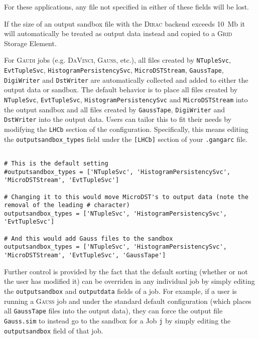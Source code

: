 \documentclass{howto}
\def\gaudi {\textsc{Gaudi}\xspace}
\def\davinci {\textsc{DaVinci}\xspace}
\def\dirac {\textsc{Dirac}\xspace}
\def\gauss {\textsc{Gauss}\xspace}
\def\grid {\textsc{Grid}\xspace}
\begin{document}
For these applications, any file not specified in either of these fields 
will be lost.

\begin{notice}
  If the size of an output sandbox file with the \dirac backend exceeds 10~Mb 
  it will automatically be treated as output data instead and copied to a \grid
  Storage Element.
\end{notice}

For \gaudi jobs (e.g. \davinci, \gauss, etc.), all files created by 
\texttt{NTupleSvc}, \texttt{EvtTupleSvc}, \texttt{HistogramPersistencySvc}, 
\texttt{MicroDSTStream},
\texttt{GaussTape}, \texttt{DigiWriter} and \texttt{DstWriter} are 
automatically collected and added to either the output data or sandbox.
The default behavior is to place all files created by 
\texttt{NTupleSvc}, \texttt{EvtTupleSvc}, \texttt{HistogramPersistencySvc} and
\texttt{MicroDSTStream} into the output sandbox and all files created by 
\texttt{GaussTape}, \texttt{DigiWriter} and \texttt{DstWriter} into the 
output data. Users can tailor this to fit their needs by modifying the
\texttt{LHCb} section of the configuration. Specifically, this means 
editing the \texttt{outputsandbox_types} field under the \texttt{[LHCb]}
section of your \texttt{.gangarc} file.

\begin{verbatim}

# This is the default setting
#outputsandbox_types = ['NTupleSvc', 'HistogramPersistencySvc', 'MicroDSTStream', 'EvtTupleSvc']

# Changing it to this would move MicroDST's to output data (note the removal of the leading # character)
outputsandbox_types = ['NTupleSvc', 'HistogramPersistencySvc', 'EvtTupleSvc']

# And this would add Gauss files to the sandbox
outputsandbox_types = ['NTupleSvc', 'HistogramPersistencySvc', 'MicroDSTStream', 'EvtTupleSvc', 'GaussTape']

\end{verbatim}

Further control is provided by the fact that the default sorting (whether or 
not the user has modified it) can be overriden in any individual job by 
simply editing the \texttt{outputsandbox} and \texttt{outputdata} fields of
a job. For example, if a user is running a \gauss job and under
the standard default configuration (which places all \texttt{GaussTape} files
into the output data), they can force the output file \texttt{Gauss.sim} to
instead go to the sandbox for a Job \texttt{j} by simply editing the 
\texttt{outputsandbox} field of that job.
\end{document}
